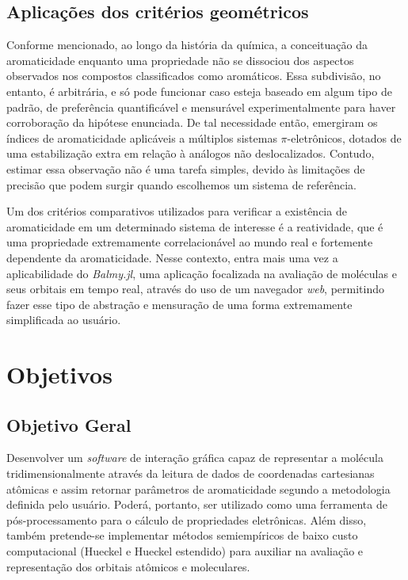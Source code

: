 \section{Aplicações dos critérios geométricos}

Conforme mencionado, ao longo da história da química, a conceituação da aromaticidade enquanto uma propriedade não se dissociou dos aspectos observados nos compostos classificados como aromáticos. Essa subdivisão, no entanto, é arbitrária, e só pode funcionar caso esteja baseado em algum tipo de padrão, de preferência quantificável e mensurável experimentalmente para haver corroboração da hipótese enunciada. De tal necessidade então, emergiram os índices de aromaticidade aplicáveis a múltiplos sistemas $\pi$-eletrônicos, dotados de uma estabilização extra em relação à análogos não deslocalizados. Contudo, estimar essa observação não é uma tarefa simples, devido às limitações de precisão que podem surgir quando escolhemos um sistema de referência. 

Um dos critérios comparativos utilizados para verificar a existência de aromaticidade em um determinado sistema de interesse é a reatividade, que é uma propriedade extremamente correlacionável ao mundo real e fortemente dependente da aromaticidade. Nesse contexto, entra mais uma vez a aplicabilidade do \textit{Balmy.jl}, uma aplicação focalizada na avaliação de moléculas e seus orbitais em tempo real, através do uso de um navegador \textit{web}, permitindo fazer esse tipo de abstração e mensuração de uma forma extremamente simplificada ao usuário.

\chapter{Objetivos}

\section{Objetivo Geral}

 Desenvolver um \textit{software} de interação gráfica capaz de representar a molécula tridimensionalmente através da leitura de dados de coordenadas cartesianas atômicas e assim retornar parâmetros de aromaticidade segundo a metodologia definida pelo usuário. Poderá, portanto, ser utilizado como uma ferramenta de pós-processamento para o cálculo de propriedades eletrônicas. Além disso, também pretende-se implementar métodos semiempíricos de baixo custo computacional (Hueckel e Hueckel estendido) para auxiliar na avaliação e representação dos orbitais atômicos e moleculares.

